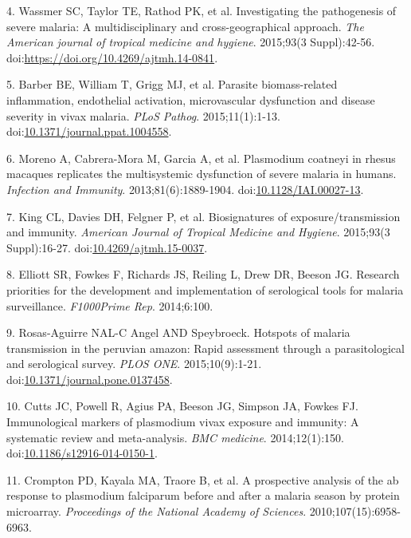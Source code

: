 \documentclass[]{article}
\begin{document}
\hypertarget{ref-wassmer2015}{}
4. Wassmer SC, Taylor TE, Rathod PK, et al. Investigating the
pathogenesis of severe malaria: A multidisciplinary and
cross-geographical approach. \emph{The American journal of tropical
medicine and hygiene}. 2015;93(3 Suppl):42-56.
doi:\href{https://doi.org/https://doi.org/10.4269/ajtmh.14-0841}{https://doi.org/10.4269/ajtmh.14-0841}.

\hypertarget{ref-barber2015}{}
5. Barber BE, William T, Grigg MJ, et al. Parasite biomass-related
inflammation, endothelial activation, microvascular dysfunction and
disease severity in vivax malaria. \emph{PLoS Pathog}. 2015;11(1):1-13.
doi:\href{https://doi.org/10.1371/journal.ppat.1004558}{10.1371/journal.ppat.1004558}.

\hypertarget{ref-Moreno2013}{}
6. Moreno A, Cabrera-Mora M, Garcia A, et al. Plasmodium coatneyi in
rhesus macaques replicates the multisystemic dysfunction of severe
malaria in humans. \emph{Infection and Immunity}. 2013;81(6):1889-1904.
doi:\href{https://doi.org/10.1128/IAI.00027-13}{10.1128/IAI.00027-13}.

\hypertarget{ref-King2015FOC}{}
7. King CL, Davies DH, Felgner P, et al. Biosignatures of
exposure/transmission and immunity. \emph{American Journal of Tropical
Medicine and Hygiene}. 2015;93(3 Suppl):16-27.
doi:\href{https://doi.org/10.4269/ajtmh.15-0037}{10.4269/ajtmh.15-0037}.

\hypertarget{ref-elliott2014}{}
8. Elliott SR, Fowkes F, Richards JS, Reiling L, Drew DR, Beeson JG.
Research priorities for the development and implementation of
serological tools for malaria surveillance. \emph{F1000Prime Rep}.
2014;6:100.

\hypertarget{ref-hotspots2015}{}
9. Rosas-Aguirre NAL-C Angel AND Speybroeck. Hotspots of malaria
transmission in the peruvian amazon: Rapid assessment through a
parasitological and serological survey. \emph{PLOS ONE}.
2015;10(9):1-21.
doi:\href{https://doi.org/10.1371/journal.pone.0137458}{10.1371/journal.pone.0137458}.

\hypertarget{ref-cutts2014meta}{}
10. Cutts JC, Powell R, Agius PA, Beeson JG, Simpson JA, Fowkes FJ.
Immunological markers of plasmodium vivax exposure and immunity: A
systematic review and meta-analysis. \emph{BMC medicine}.
2014;12(1):150.
doi:\href{https://doi.org/10.1186/s12916-014-0150-1}{10.1186/s12916-014-0150-1}.

\hypertarget{ref-crompton2010}{}
11. Crompton PD, Kayala MA, Traore B, et al. A prospective analysis of
the ab response to plasmodium falciparum before and after a malaria
season by protein microarray. \emph{Proceedings of the National Academy
of Sciences}. 2010;107(15):6958-6963.
\end{document}
